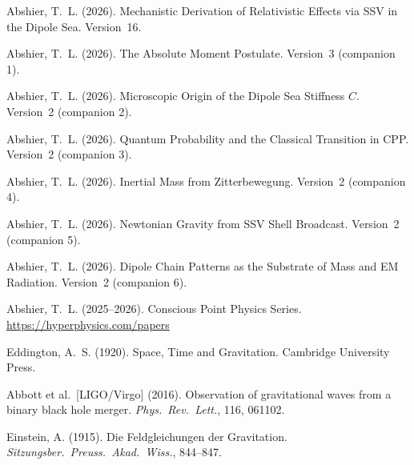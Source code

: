 \documentclass[12pt]{article}
\begin{document}
\begin{enumerate}[label={[\arabic*]}]
  \item Abshier, T.~L. (2026). Mechanistic Derivation of Relativistic
    Effects via SSV in the Dipole Sea.  Version~16.
  \item Abshier, T.~L. (2026). The Absolute Moment Postulate. Version~3
    (companion 1).
  \item Abshier, T.~L. (2026). Microscopic Origin of the Dipole Sea
    Stiffness $C$.  Version~2 (companion 2).
  \item Abshier, T.~L. (2026). Quantum Probability and the Classical
    Transition in CPP. Version~2 (companion 3).
  \item Abshier, T.~L. (2026). Inertial Mass from Zitterbewegung.
    Version~2 (companion 4).
  \item Abshier, T.~L. (2026). Newtonian Gravity from SSV Shell Broadcast.
    Version~2 (companion 5).
  \item Abshier, T.~L. (2026). Dipole Chain Patterns as the Substrate
    of Mass and EM Radiation.  Version~2 (companion 6).
  \item Abshier, T.~L. (2025--2026). Conscious Point Physics Series.
    \url{https://hyperphysics.com/papers}
  \item Eddington, A.~S. (1920). Space, Time and Gravitation.
    Cambridge University Press.
  \item Abbott et al.\ [LIGO/Virgo] (2016). Observation of gravitational
    waves from a binary black hole merger. \textit{Phys.\ Rev.\ Lett.},
    116, 061102.
  \item Einstein, A. (1915). Die Feldgleichungen der Gravitation.
    \textit{Sitzungsber.\ Preuss.\ Akad.\ Wiss.}, 844--847.
\end{enumerate}
\end{document}
